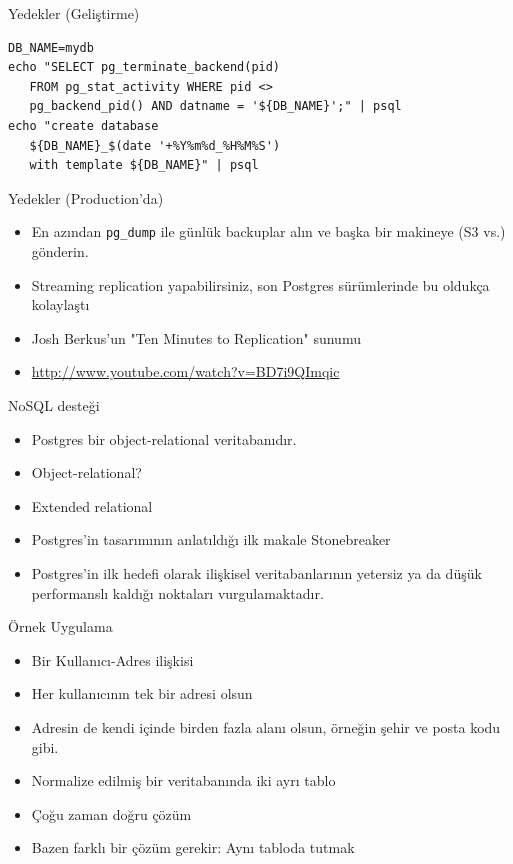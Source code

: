 \documentclass[presentation]{beamer}
\begin{document}
\begin{frame}[fragile,label=sec-18]{Yedekler (Geliştirme)}
 \begin{verbatim}
DB_NAME=mydb
echo "SELECT pg_terminate_backend(pid)
   FROM pg_stat_activity WHERE pid <>
   pg_backend_pid() AND datname = '${DB_NAME}';" | psql
echo "create database
   ${DB_NAME}_$(date '+%Y%m%d_%H%M%S')
   with template ${DB_NAME}" | psql
\end{verbatim}
\end{frame}

\begin{frame}[fragile,label=sec-19]{Yedekler (Production'da)}
 \begin{itemize}
\item En azından \texttt{pg\_dump} ile günlük backuplar alın ve başka bir makineye (S3 vs.) gönderin.
\item Streaming replication yapabilirsiniz, son Postgres sürümlerinde bu oldukça
kolaylaştı
\item Josh Berkus'un "Ten Minutes to Replication" sunumu
\item \url{http://www.youtube.com/watch?v=BD7i9QImqic}
\end{itemize}
\end{frame}


\begin{frame}[label=sec-20]{NoSQL desteği}
\begin{itemize}
\item Postgres bir object-relational veritabanıdır.
\item Object-relational?
\item Extended relational
\item Postgres'in tasarımının anlatıldığı ilk makale Stonebreaker
\item Postgres'in ilk hedefi olarak ilişkisel veritabanlarının yetersiz ya da düşük
performanslı kaldığı noktaları vurgulamaktadır.
\end{itemize}
\end{frame}

\begin{frame}[label=sec-21]{Örnek Uygulama}
\begin{itemize}
\item Bir Kullanıcı-Adres ilişkisi
\item Her kullanıcının tek bir adresi olsun
\item Adresin de kendi içinde birden fazla alanı olsun, örneğin şehir ve posta kodu gibi.

\item Normalize edilmiş bir veritabanında iki ayrı tablo
\item Çoğu zaman doğru çözüm
\item Bazen farklı bir çözüm gerekir: Aynı tabloda tutmak
\end{itemize}
\end{frame}
\end{document}
